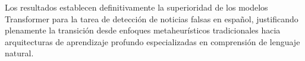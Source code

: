 Los resultados establecen definitivamente la superioridad de los modelos Transformer para la tarea de detección de noticias falsas en español, justificando plenamente la transición desde enfoques metaheurísticos tradicionales hacia arquitecturas de aprendizaje profundo especializadas en comprensión de lenguaje natural.